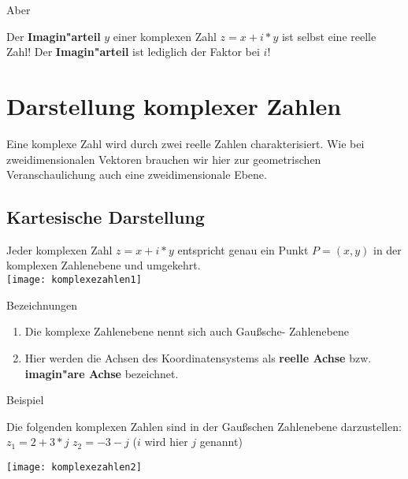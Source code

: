 \begin{Bemerkung}
Aber\\
\end{Bemerkung}

Der  \textbf{Imagin"arteil} $y$ einer komplexen Zahl  $z =x+i*y$ ist selbst eine reelle Zahl! Der \textbf{Imagin"arteil} ist lediglich der Faktor bei $i$!\\

	\section{Darstellung komplexer Zahlen}

Eine komplexe Zahl wird durch zwei reelle Zahlen charakterisiert. Wie bei zweidimensionalen Vektoren brauchen wir hier zur geometrischen Veranschaulichung auch eine zweidimensionale Ebene.\\

	\subsection{Kartesische Darstellung}

Jeder komplexen Zahl $z =x+i*y$ entspricht genau ein Punkt $P =(x,y)$ in der komplexen Zahlenebene und umgekehrt.\\

\texttt{[image: komplexezahlen1]}

\begin{Bemerkung}
Bezeichnungen\\
\end{Bemerkung}

\begin{enumerate}
\item Die komplexe Zahlenebene nennt sich auch Gaußsche- Zahlenebene
\item Hier werden die Achsen des Koordinatensystems als \textbf{reelle Achse} bzw. \textbf{imagin"are Achse} bezeichnet.\\
\end{enumerate}

\begin{Bemerkung}
Beispiel\\
\end{Bemerkung}

Die folgenden komplexen Zahlen sind in der Gaußschen Zahlenebene darzustellen: \\
$z_{1} = 2+3*j$  $z_{2} =-3-j$ ($i$ wird hier $j$ genannt)

\texttt{[image: komplexezahlen2]}

